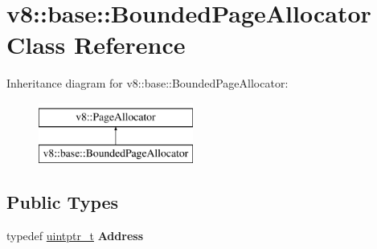 \hypertarget{classv8_1_1base_1_1BoundedPageAllocator}{}\section{v8\+:\+:base\+:\+:Bounded\+Page\+Allocator Class Reference}
\label{classv8_1_1base_1_1BoundedPageAllocator}
Inheritance diagram for v8\+:\+:base\+:\+:Bounded\+Page\+Allocator\+:\begin{figure}[H]
\begin{center}
\leavevmode
\includegraphics[height=2.000000cm]{classv8_1_1base_1_1BoundedPageAllocator}
\end{center}
\end{figure}
\subsection*{Public Types}
\begin{DoxyCompactItemize}
\item 
\mbox{\label{classv8_1_1base_1_1BoundedPageAllocator_a4cc36ab3266994416b4f2eaf49003b34}} 
typedef \mbox{\hyperlink{classuintptr__t}{uintptr\+\_\+t}} {\bfseries Address}
\end{DoxyCompactItemize}
